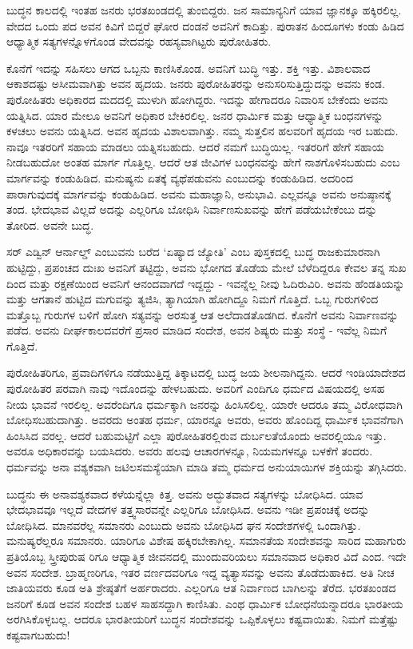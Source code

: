 ಬುದ್ಧನ ಕಾಲದಲ್ಲಿ ಇಂತಹ ಜನರು ಭರತಖಂಡದಲ್ಲಿ ತುಂಬಿದ್ದರು. ಜನ ಸಾಮಾನ್ಯನಿಗೆ ಯಾವ ಜ್ಞಾನಕ್ಕೂ ಹಕ್ಕಿರಲಿಲ್ಲ. ವೇದದ ಒಂದು ಪದ ಅವನ ಕಿವಿಗೆ ಬಿದ್ದರೆ ಘೋರ ದಂಡನೆ ಅವನಿಗೆ ಕಾದಿತ್ತು. ಪುರಾತನ ಹಿಂದೂಗಳು ಕಂಡು ಹಿಡಿದ ಆಧ್ಯಾತ್ಮಿಕ ಸತ್ಯಗಳನ್ನೊಳಗೊಂಡ ವೇದವನ್ನು ರಹಸ್ಯವಾಗಿಟ್ಟರು ಪುರೋಹಿತರು.

ಕೊನೆಗೆ ಇದನ್ನು ಸಹಿಸಲು ಆಗದ ಒಬ್ಬನು ಕಾಣಿಸಿಕೊಂಡ. ಅವನಿಗೆ ಬುದ್ಧಿ ಇತ್ತು. ಶಕ್ತಿ ಇತ್ತು. ವಿಶಾಲವಾದ ಆಕಾಶದಷ್ಟು ಅಸೀಮವಾಗಿತ್ತು ಅವನ ಹೃದಯ. ಜನರು ಪುರೋಹಿತರನ್ನು ಅನುಸರಿಸುತ್ತಿದ್ದುದನ್ನು ಅವನು ಕಂಡ. ಪುರೋಹಿತರು ಅಧಿಕಾರದ ಮದದಲ್ಲಿ ಮುಳುಗಿ ಹೋಗಿದ್ದರು. ಇದನ್ನು ಹೇಗಾದರೂ ನಿವಾರಿಸ ಬೇಕೆಂದು ಅವನು ಯತ್ನಿಸಿದ. ಯಾರ ಮೇಲೂ ಅವನಿಗೆ ಅಧಿಕಾರ ಬೇಕಿರಲಿಲ್ಲ. ಜನರ ಧಾರ್ಮಿಕ ಮತ್ತು ಆಧ್ಯಾತ್ಮಿಕ ಬಂಧನಗಳನ್ನು ಕಳಚಲು ಅವನು ಯತ್ನಿಸಿದ. ಅವನ ಹೃದಯ ವಿಶಾಲವಾಗಿತ್ತು. ನಮ್ಮ ಸುತ್ತಲಿನ ಹಲವರಿಗೆ ಹೃದಯ ಇರ ಬಹುದು. ನಾವೂ ಇತರರಿಗೆ ಸಹಾಯ ಮಾಡಲು ಯತ್ನಿಸಬಹುದು. ಆದರೆ ನಮಗೆ ಬುದ್ಧಿಯಿಲ್ಲ. ಇತರರಿಗೆ ಹೇಗೆ ಸಹಾಯ ನೀಡಬಹುದೋ ಅಂತಹ ಮಾರ್ಗ ಗೊತ್ತಿಲ್ಲ. ಆದರೆ ಆತ ಜೀವಿಗಳ ಬಂಧನವನ್ನು ಹೇಗೆ ನಾಶಗೊಳಿಸಬಹುದು ಎಂಬ ಮಾರ್ಗವನ್ನು ಕಂಡುಹಿಡಿದ. ಮನುಷ್ಯನು ಏತಕ್ಕೆ ವ್ಯಥೆಪಡುವನು ಎಂಬುದನ್ನು ಕಂಡುಹಿಡಿದ. ಅದರಿಂದ ಪಾರಾಗುವುದಕ್ಕೆ ಮಾರ್ಗವನ್ನು ಕಂಡುಹಿಡಿದ. ಅವನು ಮಹಾಜ್ಞಾನಿ, ಅನುಭಾವಿ. ಎಲ್ಲವನ್ನೂ ಅವನು ಅನುಷ್ಠಾನಕ್ಕೆ ತಂದ. ಭೇದಭಾವ ವಿಲ್ಲದೆ ಅದನ್ನು ಎಲ್ಲರಿಗೂ ಬೋಧಿಸಿ ನಿರ್ವಾಣಸುಖವನ್ನು ಹೇಗೆ ಪಡೆಯಬೇಕೆಂಬು ದನ್ನು ತೋರಿದ. ಅವನೇ ಬುದ್ಧ.

ಸರ್​ ಎಡ್ವಿನ್​ ಆರ್ನಾಲ್ಡ್​ ಎಂಬುವನು ಬರೆದ ‘ಏಷ್ಯಾದ ಜ್ಯೋತಿ’ ಎಂಬ ಪುಸ್ತಕದಲ್ಲಿ ಬುದ್ಧ ರಾಜಕುಮಾರನಾಗಿ ಹುಟ್ಟಿದ್ದು, ಪ್ರಪಂಚದ ದುಃಖ ಅವನಿಗೆ ತಟ್ಟಿದ್ದು, ಅವನು ಭೋಗದ ತೊಡೆಯ ಮೇಲೆ ಬೆಳೆದಿದ್ದರೂ ಕೇವಲ ತನ್ನ ಸುಖ ದಿಂದ ಮತ್ತು ರಕ್ಷಣೆಯಿಂದ ಅವನಿಗೆ ಆನಂದವಾಗದೆ ಇದ್ದದ್ದು - ಇವನ್ನೆಲ್ಲ ನೀವು ಓದಿರುವಿರಿ. ಅವನು ಹೆಂಡತಿಯನ್ನು ಮತ್ತು ಆಗತಾನೆ ಹುಟ್ಟಿದ ಮಗುವನ್ನು ತ್ಯಜಿಸಿ, ತ್ಯಾಗಿಯಾಗಿ ಹೋಗಿದ್ದೂ ನಿಮಗೆ ಗೊತ್ತಿದೆ. ಒಬ್ಬ ಗುರುಗಳಿಂದ ಮತ್ತೊಬ್ಬ ಗುರುಗಳ ಬಳಿಗೆ ಹೋಗಿ ಸತ್ಯವನ್ನು ಅರಸುತ್ತ ಆತ ಅಲೆದಾಡತೊಡಗಿದ. ಕೊನೆಗೆ ಅವನು ನಿರ್ವಾಣವನ್ನು ಪಡೆದ. ಅವನು ದೀರ್ಘಕಾಲದವರೆಗೆ ಪ್ರಸಾರ ಮಾಡಿದ ಸಂದೇಶ, ಅವನ ಶಿಷ್ಯರು ಮತ್ತು ಸಂಸ್ಥೆ - ಇವೆಲ್ಲ ನಿಮಗೆ ಗೊತ್ತಿದೆ.

ಪುರೋಹಿತರಿಗೂ, ಪ್ರವಾದಿಗಳಿಗೂ ನಡೆಯುತ್ತಿದ್ದ ತಿಕ್ಕಾಟದಲ್ಲಿ ಬುದ್ಧ ಜಯ ಶೀಲನಾಗಿದ್ದನು. ಆದರೆ ಇಂಡಿಯಾದೇಶದ ಪುರೋಹಿತರ ಪರವಾಗಿ ನಾವು ಇದೊಂದನ್ನು ಹೇಳಬಹುದು. ಅವರಿಗೆ ಎಂದಿಗೂ ಧರ್ಮದ ವಿಷಯದಲ್ಲಿ ಅಸಹ ನೀಯ ಭಾವನೆ ಇರಲಿಲ್ಲ. ಅವರೆಂದಿಗೂ ಧರ್ಮಕ್ಕಾಗಿ ಜನರನ್ನು ಹಿಂಸಿಸಲಿಲ್ಲ. ಯಾರೇ ಆದರೂ ತಮ್ಮ ವಿರೋಧವಾಗಿ ಬೋಧಿಸಬಹುದಾಗಿತ್ತು. ಅವರದು ಅಂತಹ ಧರ್ಮ, ಯಾರನ್ನೂ ಅವರು, ಅವರು ಹೊಂದಿದ್ದ ಧಾರ್ಮಿಕ ಭಾವನೆಗಾಗಿ ಹಿಂಸಿಸಿದ ವರಲ್ಲ. ಆದರೆ ಬಹುಮಟ್ಟಿಗೆ ಎಲ್ಲಾ ಪುರೋಹಿತರಲ್ಲಿರುವ ದುರ್ಬಲತೆಯೊಂದು ಅವರಲ್ಲಿಯೂ ಇತ್ತು. ಅವರೂ ಅಧಿಕಾರವನ್ನು ಬಯಸಿದರು. ಅವರು ಹಲವು ಆಚಾರಗಳನ್ನೂ, ನಿಯಮಗಳನ್ನೂ ಬಳಕೆಗೆ ತಂದರು. ಧರ್ಮವನ್ನು ಅನಾ ವಶ್ಯಕವಾಗಿ ಜಟಿಲಸಮಸ್ಯೆಯಾಗಿ ಮಾಡಿ ತಮ್ಮ ಧರ್ಮದ ಅನುಯಾಯಿಗಳ ಶಕ್ತಿಯನ್ನು ತಗ್ಗಿಸಿದರು.

ಬುದ್ಧನು ಈ ಅನಾವಶ್ಯಕವಾದ ಕಳೆಯನ್ನೆಲ್ಲಾ ಕಿತ್ತ. ಅವನು ಅದ್ಭುತವಾದ ಸತ್ಯಗಳನ್ನು ಬೋಧಿಸಿದ. ಯಾವ ಭೇದಭಾವವೂ ಇಲ್ಲದೆ ವೇದಗಳ ತತ್ತ್ವಸಾರವನ್ನೇ ಎಲ್ಲರಿಗೂ ಬೋಧಿಸಿದ. ಅವನು ಇಡೀ ಪ್ರಪಂಚಕ್ಕೆ ಅದನ್ನು ಬೋಧಿಸಿದ. ಮಾನವರೆಲ್ಲ ಸಮಾನರು ಎಂಬುದು ಅವನು ಬೋಧಿಸಿದ ಘನ ಸಂದೇಶಗಳಲ್ಲಿ ಒಂದಾಗಿತ್ತು. ಮನುಷ್ಯರೆಲ್ಲರೂ ಸಮಾನರು. ಯಾರಿಗೂ ವಿಶೇಷ ಹಕ್ಕಿರಬೇಕಾಗಿಲ್ಲ. ಸಮಾನತೆಯ ಸಂದೇಶವನ್ನು ಸಾರಿದ ಮಹಾಗುರು ಪ್ರತಿಯೊಬ್ಬ ಸ್ತ್ರೀಪುರುಷ ರಿಗೂ ಆಧ್ಯಾತ್ಮಿಕ ಜೀವನದಲ್ಲಿ ಮುಂದುವರಿಯಲು ಸಮಾನವಾದ ಅಧಿಕಾರ ವಿದೆ ಎಂದ. ಇದೇ ಅವನ ಸಂದೇಶ. ಬ್ರಾಹ್ಮಣರಿಗೂ, ಇತರ ವರ್ಣದವರಿಗೂ ಇದ್ದ ವ್ಯತ್ಯಾಸವನ್ನು ಅವನು ತೊಡೆದುಹಾಕಿದ. ಅತಿ ನೀಚ ಜಾತಿಯವರು ಕೂಡ ಅತಿ ಶ್ರೇಷ್ಠತೆಗೆ ಅರ್ಹರಾದರು. ಎಲ್ಲರಿಗೂ ಆತ ನಿರ್ವಾಣದ ಬಾಗಿಲನ್ನು ತೆರೆದ. ಭರತಖಂಡದ ಜನರಿಗೆ ಕೂಡ ಅವನ ಸಂದೇಶ ಬಹಳ ಸಾಹಸದ್ದಾಗಿ ಕಾಣಿಸಿತು. ಎಂಥ ಧಾರ್ಮಿಕ ಬೋಧನೆಯನ್ನಾದರೂ ಭಾರತೀಯ ಅರಗಿಸಿಕೊಳ್ಳಬಲ್ಲ. ಆದರೂ ಭಾರತೀಯರಿಗೆ ಬುದ್ಧನ ಸಂದೇಶವನ್ನು ಒಪ್ಪಿಕೊಳ್ಳಲು ಕಷ್ಟವಾಯಿತು. ನಿಮಗೆ ಮತ್ತೆಷ್ಟು ಕಷ್ಟವಾಗಬಹುದು!


